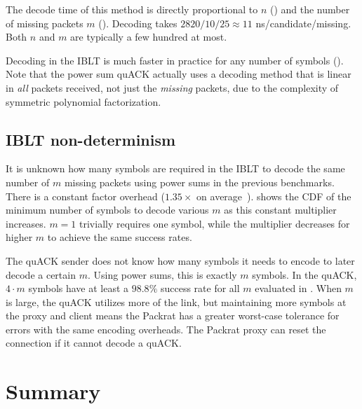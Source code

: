 The decode time of this method is directly proportional to $n$ ()
and the number of missing packets $m$ ().
Decoding takes $2820/10/25 \approx 11$ ns/candidate/missing.
Both $n$ and $m$ are typically a few hundred at most.

Decoding in the IBLT is much faster in practice for any number of symbols
(). Note that the power sum quACK actually uses a decoding
method that is linear in \textit{all} packets received, not just the \textit
{missing} packets, due to the complexity of symmetric polynomial
factorization.

\subsection{IBLT non-determinism}
\label{sec:quack:microbenchmarks:non-determinism}




It is unknown how many symbols are required in the IBLT to decode the same
number of $m$ missing packets using power sums in the previous benchmarks.
There is a constant factor overhead ($1.35\times$ on average~\cite
{yang2024practical}).
 shows the CDF of the minimum number of symbols to decode
various $m$ as this constant multiplier increases. $m=1$ trivially requires
one symbol, while the multiplier decreases for higher $m$ to achieve the same
success rates.

The quACK sender does not know how many symbols it needs to encode to later
decode a certain $m$. Using power sums, this is exactly $m$ symbols. In
the quACK, $4 \cdot m$ symbols have at least a $\!98.8\%$ success rate for
all $m$ evaluated in . When $m$ is large, the quACK utilizes more
of the link, but maintaining more symbols at the proxy and client means
the Packrat has a greater worst-case tolerance for errors with the same encoding
overheads. The Packrat proxy can reset the connection if it cannot decode a quACK.

\section{Summary}
\label{sec:quack:summary}
